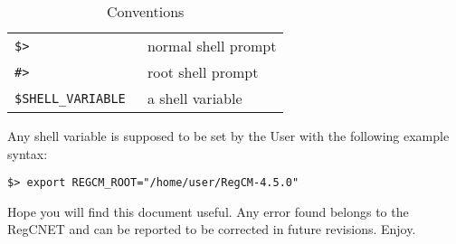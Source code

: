 \begin{table}[ht]
\caption{Conventions}
\vspace{0.05 in}
\centering
\begin{tabular}{l|l}
\hline
\verb=$> = & normal shell prompt \\
\verb=#> = & root shell prompt \\
\verb=$SHELL_VARIABLE = & a shell variable \\
\hline
\end{tabular}
\label{conventions}
\end{table}

Any shell variable is supposed to be set by the User with the following example
syntax:

\begin{Verbatim}
$> export REGCM_ROOT="/home/user/RegCM-4.5.0"
\end{Verbatim}

Hope you will find this document useful. Any error found belongs to the
RegCNET and can be reported to be corrected in future revisions. Enjoy.
